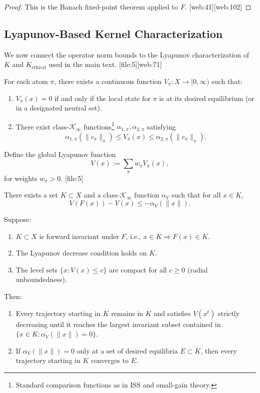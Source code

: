 \documentclass[11pt]{article}
\begin{document}
\begin{proof}
This is the Banach fixed-point theorem applied to \(F\). [web:41][web:102]
\end{proof}

\subsection{Lyapunov-Based Kernel Characterization}

We now connect the operator norm bounds to the Lyapunov characterization of \(K\) and \(K_{\text{ethical}}\) used in the main text. [file:5][web:71]

\begin{assumption}
For each atom \(\pi\), there exists a continuous function \(V_\pi:X\to[0,\infty)\) such that:
\begin{enumerate}[label=(\alph*), leftmargin=*]
  \item \(V_\pi(x) = 0\) if and only if the local state for \(\pi\) is at its desired equilibrium (or in a designated neutral set).
  \item There exist class-\(\mathcal{K}_\infty\) functions\footnote{Standard comparison functions as in ISS and small-gain theory.} \(\alpha_{1,\pi}, \alpha_{2,\pi}\) satisfying
  \[
    \alpha_{1,\pi}(\|c_\pi\|_\pi) \leq V_\pi(x) \leq \alpha_{2,\pi}(\|c_\pi\|_\pi).
  \]
\end{enumerate}
\end{assumption}

Define the global Lyapunov function
\[
  V(x) := \sum_{\pi} w_\pi V_\pi(x),
\]
for weights \(w_\pi>0\). [file:5]

\begin{assumption}
There exists a set \(K\subset X\) and a class-\(\mathcal{K}_\infty\) function \(\alpha_V\) such that for all \(x\in K\),
\[
  V(F(x)) - V(x) \leq -\alpha_V(\|x\|).
\]
\end{assumption}

\begin{theorem}
Suppose:
\begin{enumerate}[label=(\roman*), leftmargin=*]
  \item \(K\subset X\) is forward invariant under \(F\), i.e., \(x\in K \Rightarrow F(x)\in K\).
  \item The Lyapunov decrease condition holds on \(K\).
  \item The level sets \(\{x: V(x)\leq c\}\) are compact for all \(c\geq 0\) (radial unboundedness).
\end{enumerate}
Then:
\begin{enumerate}[label=(a), leftmargin=*]
  \item Every trajectory starting in \(K\) remains in \(K\) and satisfies \(V(x^t)\) strictly decreasing until it reaches the largest invariant subset contained in \(\{x\in K: \alpha_V(\|x\|)=0\}\).
  \item If \(\alpha_V(\|x\|)=0\) only at a set of desired equilibria \(E\subset K\), then every trajectory starting in \(K\) converges to \(E\).
\end{enumerate}
\label{thm:K-Lyapunov}
\end{theorem}
\end{document}
